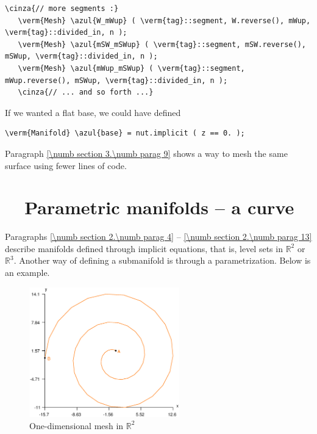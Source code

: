\begin{Verbatim}[commandchars=\\\{\},formatcom=\small\tt,frame=single,
   label=parag-\ref{\numb section 2.\numb parag 13}.cpp,rulecolor=\color{coment},
   baselinestretch=0.94,framesep=2mm]
   \cinza{// more segments :}
   \verm{Mesh} \azul{W_mWup} ( \verm{tag}::segment, W.reverse(), mWup, \verm{tag}::divided_in, n );
   \verm{Mesh} \azul{mSW_mSWup} ( \verm{tag}::segment, mSW.reverse(), mSWup, \verm{tag}::divided_in, n );
   \verm{Mesh} \azul{mWup_mSWup} ( \verm{tag}::segment, mWup.reverse(), mSWup, \verm{tag}::divided_in, n );
   \cinza{// ... and so forth ...}
\end{Verbatim}

If we wanted a flat base, we could have defined

\begin{Verbatim}[commandchars=\\\{\},formatcom=\small\tt,baselinestretch=0.94]
   \verm{Manifold} \azul{base} = nut.implicit ( z == 0. );
\end{Verbatim}

Paragraph \ref{\numb section 3.\numb parag 9} shows a way to mesh the same surface using
fewer lines of code.


\section{~~Parametric manifolds -- a curve}\label{\numb section 2.\numb parag 14}

Paragraphs \ref{\numb section 2.\numb parag 4} -- \ref{\numb section 2.\numb parag 13} describe
manifolds defined through implicit equations, that is, level sets in $ \mathbb{R}^2 $ or
$ \mathbb{R}^3 $.
Another way of defining a submanifold is through a parametrization.
Below is an example.

\begin{figure}[ht] \centering
  \includegraphics[width=65mm]{spiral}
  \caption{One-dimensional mesh in $ {\mathbb R}^2 $}
\end{figure}

